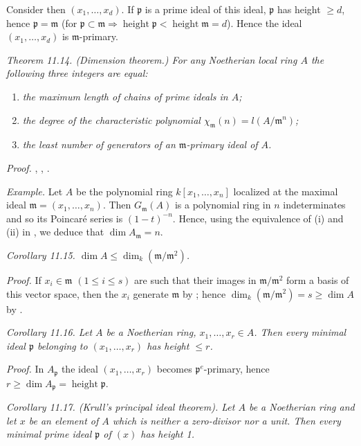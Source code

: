 Consider then $(x_1,\ldots,x_d)$. If $\mathfrak p$ is a prime ideal of this ideal, $\mathfrak p$ has height $\geq d$, hence $\mathfrak p=\mathfrak m$ (for $\mathfrak p\subset\mathfrak m\Rightarrow\operatorname{height}\mathfrak p<\operatorname{height}\mathfrak m=d$). Hence the ideal $(x_1,\ldots,x_d)$ is $\mathfrak m$-primary. \proofbox

\medskip
\noindent\textit{Theorem 11.14. (Dimension theorem.) For any Noetherian local ring $A$ the following three integers are equal:}
\begin{enumerate}
\item[i)] \textit{the maximum length of chains of prime ideals in $A$;}
\item[ii)] \textit{the degree of the characteristic polynomial $\chi_{\mathfrak m}(n)=l(A/\mathfrak m^n)$;}
\item[iii)] \textit{the least number of generators of an $\mathfrak m$-primary ideal of $A$.}
\end{enumerate}
\textit{Proof.} , , . \proofbox

\textit{Example.} Let $A$ be the polynomial ring $k[x_1,\ldots,x_n]$ localized at the maximal ideal $\mathfrak m=(x_1,\ldots,x_n)$. Then $G_{\mathfrak m}(A)$ is a polynomial ring in $n$ indeterminates and so its Poincar\'e series is $(1-t)^{-n}$. Hence, using the equivalence of (i) and (ii) in , we deduce that $\dim A_{\mathfrak m}=n$.

\medskip
\noindent\textit{Corollary 11.15. $\dim A\leq\dim_k(\mathfrak m/\mathfrak m^2)$.}

\textit{Proof.} If $x_i\in\mathfrak m$ $(1\leq i\leq s)$ are such that their images in $\mathfrak m/\mathfrak m^2$ form a basis of this vector space, then the $x_i$ generate $\mathfrak m$ by ; hence $\dim_k(\mathfrak m/\mathfrak m^2)=s\geq\dim A$ by . \proofbox

\medskip
\noindent\textit{Corollary 11.16. Let $A$ be a Noetherian ring, $x_1,\ldots,x_r\in A$. Then every minimal ideal $\mathfrak p$ belonging to $(x_1,\ldots,x_r)$ has height $\leq r$.}

\textit{Proof.} In $A_{\mathfrak p}$ the ideal $(x_1,\ldots,x_r)$ becomes $\mathfrak p^e$-primary, hence $r\geq\dim A_{\mathfrak p}=\operatorname{height}\mathfrak p$. \proofbox

\medskip
\noindent\textit{Corollary 11.17. (Krull's principal ideal theorem). Let $A$ be a Noetherian ring and let $x$ be an element of $A$ which is neither a zero-divisor nor a unit. Then every minimal prime ideal $\mathfrak p$ of $(x)$ has height 1.}

